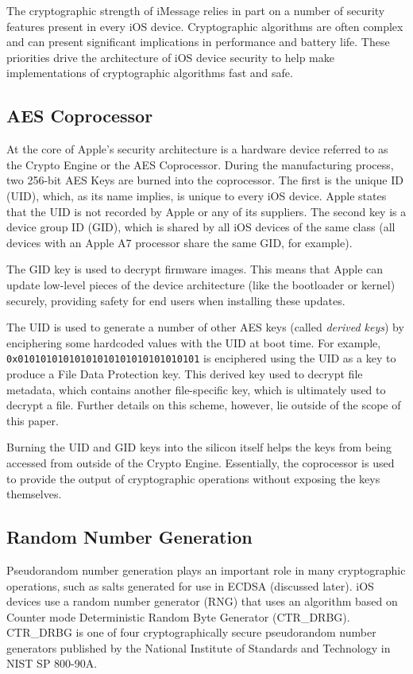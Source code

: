 The cryptographic strength of iMessage relies in part on a number of security
features present in every iOS device. Cryptographic algorithms are often
complex and can present significant implications in performance and battery
life.  These priorities drive the architecture of iOS device security to help
make implementations of cryptographic algorithms fast and safe.

\subsection{AES Coprocessor}
At the core of Apple's security architecture is a hardware device referred to
as the Crypto Engine or the AES Coprocessor. During the manufacturing process,
two 256-bit AES Keys are burned into the coprocessor. The first is the unique
ID (UID), which, as its name implies, is unique to every iOS device. Apple
states that the UID is not recorded by Apple or any of its
suppliers\cite{apple}. The second key is a device group ID (GID), which is
shared by all iOS devices of the same class (all devices with an Apple A7
processor share the same GID, for example).

The GID key is used to decrypt firmware images. This means that Apple can
update low-level pieces of the device architecture (like the bootloader or
kernel) securely, providing safety for end users when installing these updates.

The UID is used to generate a number of other AES keys (called \textit{derived
keys}) by enciphering some hardcoded values with the UID at boot time. For
example, \texttt{0x01010101010101010101010101010101} is enciphered using the
UID as a key to produce a File Data Protection key. This derived key used to
decrypt file metadata, which contains another file-specific key, which is
ultimately used to decrypt a file. Further details on this scheme, however, lie
outside of the scope of this paper.

Burning the UID and GID keys into the silicon itself helps the keys from being
accessed from outside of the Crypto Engine. Essentially, the coprocessor is
used to provide the output of cryptographic operations without exposing the
keys themselves.

\subsection{Random Number Generation}
Pseudorandom number generation plays an important role in many cryptographic
operations, such as salts generated for use in ECDSA (discussed later). iOS
devices use a random number generator (RNG) that uses an algorithm based on
Counter mode Deterministic Random Byte Generator (CTR\_DRBG).  CTR\_DRBG is one
of four cryptographically secure pseudorandom number generators published by
the National Institute of Standards and Technology in NIST SP
800-90A\cite{nistsp80090a}.

